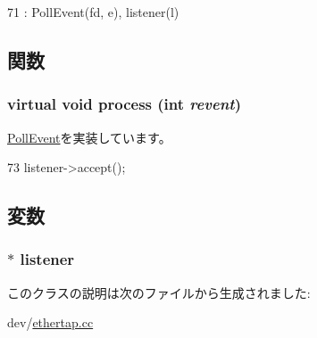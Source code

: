 \begin{DoxyCode}
71             : PollEvent(fd, e), listener(l) {}
\end{DoxyCode}


\subsection{関数}
\hypertarget{classTapListener_1_1Event_a2b093972df00400e2325baed216afc46}{
\subsubsection[{process}]{\setlength{\rightskip}{0pt plus 5cm}virtual void process (int {\em revent})}}
\label{classTapListener_1_1Event_a2b093972df00400e2325baed216afc46}


\hyperlink{classPollEvent_a8b870dc0eeb339499d64aa56fc0e2aa5}{PollEvent}を実装しています。


\begin{DoxyCode}
73 { listener->accept(); }
\end{DoxyCode}


\subsection{変数}
\hypertarget{classTapListener_1_1Event_a63f477b36e686c92354d58f1c89733e4}{
\subsubsection[{listener}]{$\ast$ {\bf listener}}}
\label{classTapListener_1_1Event_a63f477b36e686c92354d58f1c89733e4}


このクラスの説明は次のファイルから生成されました:\begin{DoxyCompactItemize}
\item 
dev/\hyperlink{ethertap_8cc}{ethertap.cc}\end{DoxyCompactItemize}
